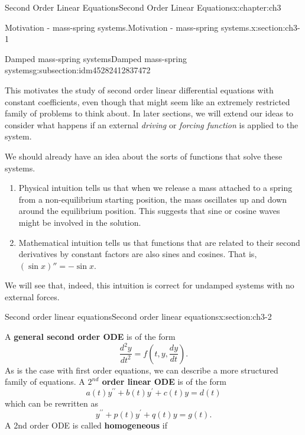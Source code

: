 \documentclass[oneside,10pt,]{book}
\newcommand{\terminology}[1]{\textbf{#1}}
\numberwithin{equation}{section}
\numberwithin{equation}{section}
\begin{document}
\begin{chapterptx}{Second Order Linear Equations}{}{Second Order Linear Equations}{}{}{x:chapter:ch3}
\begin{sectionptx}{Motivation - mass-spring systems.}{}{Motivation - mass-spring systems.}{}{}{x:section:ch3-1}
\begin{subsectionptx}{Damped mass-spring systems}{}{Damped mass-spring systems}{}{}{g:subsection:idm45282412837472}
\par
This motivates the study of second order linear differential equations with constant coefficients, even though that might seem like an extremely restricted family of problems to think about. In later sections, we will extend our ideas to consider what happens if an external \emph{driving} or \emph{forcing function} is applied to the system.%
\par
We should already have an idea about the sorts of functions that solve these systems.%
\begin{enumerate}
\item{}Physical intuition tells us that when we release a mass attached to a spring from a non-equilibrium starting position, the mass oscillates up and down around the equilibrium position. This suggests that sine or cosine waves might be involved in the solution.%
\item{}Mathematical intuition tells us that functions that are related to their second derivatives by constant factors are also sines and cosines. That is, \((\sin x)'' = - \sin x\).%
\end{enumerate}
We will see that, indeed, this intuition is correct for undamped systems with no external forces.%
\end{subsectionptx}
\end{sectionptx}
%
%
\typeout{************************************************}
\typeout{************************************************}
%
\begin{sectionptx}{Second order linear equations}{}{Second order linear equations}{}{}{x:section:ch3-2}
\begin{introduction}{}%
A \terminology{general second order ODE} is of the form%
\begin{equation*}
\frac{d^{2}y}{dt^{2}}=f\left(t,y,\frac{dy}{dt}\right).
\end{equation*}
As is the case with first order equations, we can describe a more structured family of equations. A \terminology{\(2^{nd}\) order linear ODE} is of the form%
\begin{equation*}
a(t)y^{\prime\prime}+b(t)y^{\prime}+c(t)y=d(t)
\end{equation*}
which can be rewritten as%
\begin{equation*}
y^{\prime\prime}+p(t)y^{\prime}+q(t)y=g(t).
\end{equation*}
A 2nd order ODE is called \terminology{homogeneous} if%
\begin{equation*}

\end{equation*}
\end{introduction}
\end{sectionptx}
\end{chapterptx}
\end{document}
